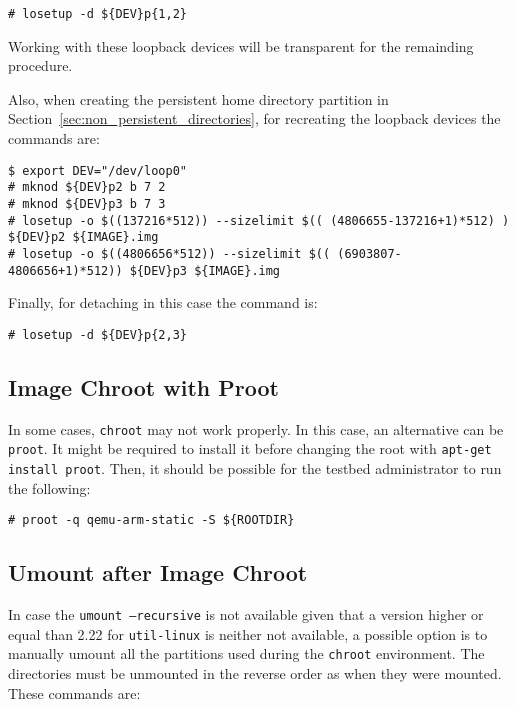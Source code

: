 \begin{lstlisting}[]
# losetup -d ${DEV}p{1,2}
\end{lstlisting}
\FloatBarrier
\vspace{-5mm}

Working with these loopback devices will be transparent for the remainding
procedure.

Also, when creating the persistent home directory partition in
Section~\ref{sec:non_persistent_directories}, for recreating the loopback
devices the commands are:

\begin{lstlisting}[]
$ export DEV="/dev/loop0"
# mknod ${DEV}p2 b 7 2
# mknod ${DEV}p3 b 7 3
# losetup -o $((137216*512)) --sizelimit $(( (4806655-137216+1)*512) ) ${DEV}p2 ${IMAGE}.img
# losetup -o $((4806656*512)) --sizelimit $(( (6903807-4806656+1)*512)) ${DEV}p3 ${IMAGE}.img
\end{lstlisting}
\FloatBarrier
\vspace{-5mm}

Finally, for detaching in this case the command is:
\begin{lstlisting}[]
# losetup -d ${DEV}p{2,3}
\end{lstlisting}
\FloatBarrier
\vspace{-5mm}

\subsection{Image Chroot with Proot}
\label{sec:chroot}

In some cases, \texttt{chroot} may not work properly. In this case, an
alternative can be \texttt{proot}. It might be required to install it
before changing the root with \texttt{apt-get install proot}. Then, it
should be possible for the testbed administrator to run the following:

\begin{lstlisting}[]
# proot -q qemu-arm-static -S ${ROOTDIR}
\end{lstlisting}
\FloatBarrier
\vspace{-5mm}


\subsection{Umount after Image Chroot}
\label{sec:umount}

In case the \texttt{umount --recursive} is not available given that a version
higher or equal than 2.22 for \texttt{util-linux} is neither not available,
a possible option is to manually umount all the partitions used during the
\texttt{chroot} environment. The directories must be unmounted in the reverse
order as when they were mounted. These commands are:

